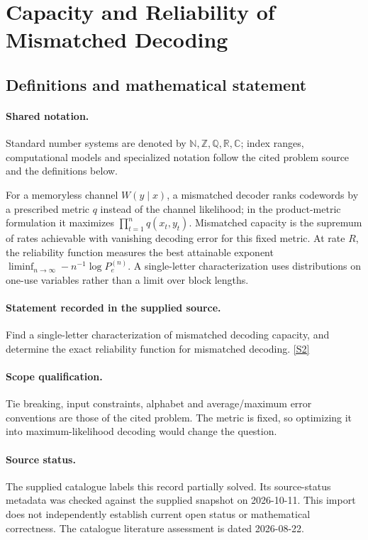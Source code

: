 \documentclass[11pt]{article}
\newcommand{\sref}[2]{\hyperlink{source:#1:#2}{[S#2]}}
\begin{document}
\section{Capacity and Reliability of Mismatched Decoding}\label{statement}

\subsection{Definitions and mathematical statement}

\paragraph{Shared notation.}Standard number systems are denoted by $\mathbb N,\mathbb Z,\mathbb Q,\mathbb R,\mathbb C$; index ranges, computational models and specialized notation follow the cited problem source and the definitions below.


For a memoryless channel $W(y\mid x)$, a mismatched decoder ranks codewords by a prescribed metric $q$ instead of the channel likelihood; in the product-metric formulation it maximizes $\prod_{t=1}^n q(x_t,y_t)$. Mismatched capacity is the supremum of rates achievable with vanishing decoding error for this fixed metric. At rate $R$, the reliability function measures the best attainable exponent $\liminf_{n\to\infty}-n^{-1}\log P_e^{(n)}$. A single-letter characterization uses distributions on one-use variables rather than a limit over block lengths.
\paragraph{Statement recorded in the supplied source.}
Find a single-letter characterization of mismatched decoding capacity, and determine the exact reliability function for mismatched decoding. \sref{statement}{2}
\paragraph{Scope qualification.}
Tie breaking, input constraints, alphabet and average/maximum error conventions are those of the cited problem. The metric is fixed, so optimizing it into maximum-likelihood decoding would change the question.
\paragraph{Source status.}
The supplied catalogue labels this record partially solved. Its source-status metadata was checked against the supplied snapshot on 2026-10-11. This import does not independently establish current open status or mathematical correctness. The catalogue literature assessment is dated 2026-08-22.
\end{document}
